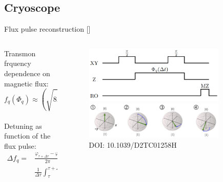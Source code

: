 \documentclass[aspectratio=169,10pt]{beamer}
\begin{document}
\subsection{Cryoscope}

\begin{frame}{Flux pulse reconstruction [\cite{rol_time-domain_2020}]}
  \begin{columns}
    \begin{column}{0.4\textwidth}
      \centering
      Transmon frquency dependence on magnetic flux:
      \begin{equation*}
        f_q(\Phi_q) \approx \left( \sqrt{8E_J E_C \left| \cos\left(\pi \frac{\Phi_q}{\Phi_0}\right) \right|} \right)
      \end{equation*}\\
      \vspace{1em}
      Detuning as function of the flux pulse:
      \begin{align*}
        \Delta f_q = &\frac{\varphi_{\tau+\Delta\tau}-\varphi_\tau}{2\pi} \approx \\
        &\frac{1}{\Delta \tau} \int_{\tau}^{\tau + \Delta \tau} \Delta f_q(\Phi_{q, \tau + \Delta \tau} (t))
      \end{align*}
    \end{column}
    \begin{column}{0.6\textwidth}
      \begin{figure}
        \centering
        \includegraphics[width=0.85\textwidth]{figures/cryoscope_pulse.png}\\
        \vspace{3em}
        \includegraphics[width=0.85\textwidth]{figures/BlochEvolution.png}\\
        {\tiny DOI: 10.1039/D2TC01258H}
      \end{figure}
    \end{column}
  \end{columns}
\end{frame}
\end{document}
